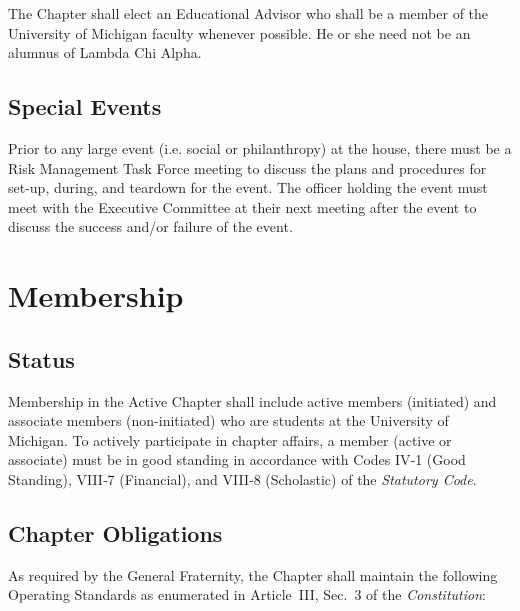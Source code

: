 \documentclass{article}
\begin{document}
The Chapter shall elect an Educational Advisor who shall be a member of the
University of Michigan faculty whenever possible. He or she need not be an
alumnus of Lambda Chi Alpha.

\subsection{Special Events}

Prior to any large event (i.e. social or philanthropy) at the house, there must
be a Risk Management Task Force meeting to discuss the plans and procedures for
set-up, during, and teardown for the event. The officer holding the event must
meet with the Executive Committee at their next meeting after the event to
discuss the success and/or failure of the event.

\section{Membership}

\subsection{Status}

Membership in the Active Chapter shall include active members (initiated) and
associate members (non-initiated) who are students at the University of
Michigan. To actively participate in chapter affairs, a member (active or
associate) must be in good standing in accordance with Codes IV‑1 (Good
Standing), VIII‑7 (Financial), and VIII‑8 (Scholastic) of the \emph{Statutory
Code}.

\subsection{Chapter Obligations}

As required by the General Fraternity, the Chapter shall maintain the following
Operating Standards as enumerated in Article~III, Sec.~3 of the
\emph{Constitution}:
\end{document}
